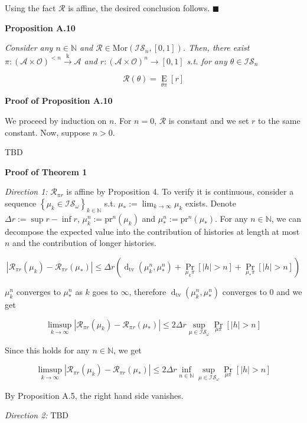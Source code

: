 \documentclass[a4paper]{article}
\newcommand{\Co}[1]{}
\newcommand{\AP}[1]{\left(#1\right)}
\newcommand{\AB}[1]{\left[#1\right]}
\newcommand{\AC}[1]{\left\{#1\right\}}
\newcommand{\Pa}[2]{\underset{#1}{\operatorname{Pr}}\AB{#2}}
\newcommand{\Ea}[2]{\underset{#1}{\operatorname{E}}\AB{#2}}
\newcommand{\Dtva}[1]{\operatorname{d}_{\text{tv}}\AP{#1}}
\newcommand{\Nats}{\mathbb{N}}
\newcommand{\Mor}{\mathrm{Mor}}
\newcommand{\Lim}[1]{\lim_{#1 \rightarrow \infty}}
\newcommand{\LimSup}[1]{\limsup_{#1 \rightarrow \infty}}
\newcommand{\Abs}[1]{\left\vert #1 \right\vert}
\newcommand{\K}{\xrightarrow{\mathrm{k}}}
\newcommand{\A}{\mathcal{A}}
\newcommand{\Ob}{\mathcal{O}}
\newcommand{\AO}{\AP{\A\times\Ob}}
\newcommand{\R}{\mathcal{R}}
\newcommand{\IS}{\mathcal{IS}}
\newcommand{\Prj}{\mathrm{pr}}
\begin{document}
Using the fact $\R$ is affine, the desired conclusion follows. $\blacksquare$

\textbf{Proposition A.10}\Co{b}

\textit{Consider any $n\in\Nats$ and $\R\in\Mor\AP{\IS_n,[0,1]}$. Then, there exist $\pi:\AO^{<n}\K\A$ and $r:\AO^n\rightarrow[0,1]$ s.t. for any $\theta\in\IS_n$}\Co{i}

$$\R(\theta)=\Ea{\theta\pi}{r}$$

\textbf{Proof of Proposition A.10}\Co{b}

We proceed by induction on $n$. For $n=0$, $\R$ is constant and we set $r$ to the same constant. Now, suppose $n>0$.

TBD

\textbf{Proof of Theorem 1}\Co{b}

\textit{Direction 1:}\Co{i} $\R_{\pi r}$ is affine by Proposition 4. To verify it is continuous, consider a sequence $\AC{\mu_k\in\IS_\omega}_{k\in\Nats}$ s.t. $\mu_*:=\Lim{k}\mu_k$ exists. Denote $\Delta r:=\sup r - \inf r$, $\mu_k^n:=\Prj^n\AP{\mu_k}$ and $\mu^n_*:=\Prj^n\AP{\mu_*}$. For any $n\in\Nats$, we can decompose the expected value into the contribution of histories at length at most $n$ and the contribution of longer histories.

$$\Abs{\R_{\pi r}\AP{\mu_k}-\R_{\pi r}\AP{\mu_*}} \leq \Delta r\AP{\Dtva{\mu_k^n,\mu_*^n}+\Pa{\mu_k\pi}{\Abs{h}>n} +\Pa{\mu_*\pi}{\Abs{h}>n}}$$

$\mu_k^n$ converges to $\mu_*^n$ as $k$ goes to $\infty$, therefore $\Dtva{\mu_k^n,\mu_*^n}$ converges to 0 and we get

$$\LimSup{k}\Abs{\R_{\pi r}\AP{\mu_k}-\R_{\pi r}\AP{\mu_*}} \leq 2\Delta r\sup_{\mu\in\IS_\omega}\Pa{\mu\pi}{\Abs{h}>n}$$

Since this holds for any $n\in\Nats$, we get

$$\LimSup{k}\Abs{\R_{\pi r}\AP{\mu_k}-\R_{\pi r}\AP{\mu_*}} \leq 2\Delta r\inf_{n\in\Nats}\sup_{\mu\in\IS_\omega}\Pa{\mu\pi}{\Abs{h}>n}$$

By Proposition A.5, the right hand side vanishes.

\textit{Direction 2:}\Co{i} TBD
\end{document}
